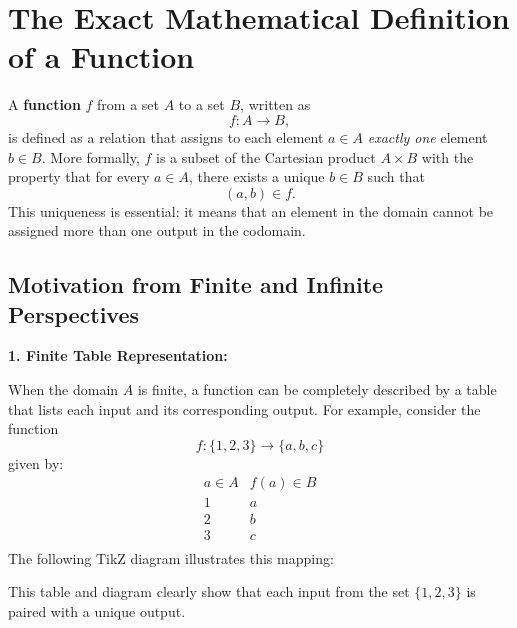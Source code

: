 \documentclass[12pt]{article}
\begin{document}
\section*{The Exact Mathematical Definition of a Function}

A \textbf{function} $f$ from a set $A$ to a set $B$, written as
\[
f: A \to B,
\]
is defined as a relation that assigns to each element $a \in A$ \emph{exactly one} element $b \in B$. More formally, $f$ is a subset of the Cartesian product $A \times B$ with the property that for every $a \in A$, there exists a unique $b \in B$ such that 
\[
(a,b) \in f.
\]
This uniqueness is essential: it means that an element in the domain cannot be assigned more than one output in the codomain.

\subsection*{Motivation from Finite and Infinite Perspectives}

\textbf{1. Finite Table Representation:}

When the domain $A$ is finite, a function can be completely described by a table that lists each input and its corresponding output. For example, consider the function 
\[
f: \{1,2,3\} \to \{a,b,c\}
\]
given by:
\[
\begin{array}{c|c}
a \in A & f(a) \in B \\
\hline
1 & a \\
2 & b \\
3 & c \\
\end{array}
\]
The following TikZ diagram illustrates this mapping:

\begin{center}
\end{center}

This table and diagram clearly show that each input from the set $\{1,2,3\}$ is paired with a unique output.
\end{document}
